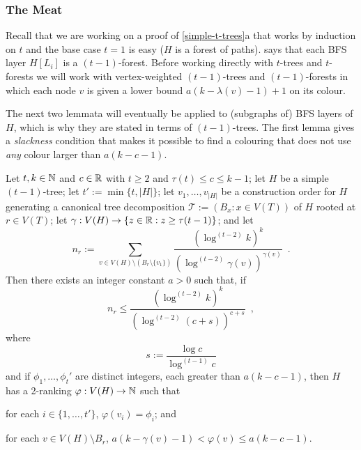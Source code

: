 \documentclass[kpfonts]{patmorin}
\newcommand{\trn}{\chi_2}
\theoremstyle{named}
\newcommand{\weirdref}[2]{\cref{#1}#2}
\begin{document}
\subsubsection{The Meat}


Recall that we are working on a proof of \weirdref{simple-t-trees}{a} that works by induction on $t$ and the base case $t=1$ is easy ($H$ is a forest of paths).  says that each BFS layer $H[L_i]$ is a $(t-1)$-forest.  Before working directly with $t$-trees and $t$-forests we will work with vertex-weighted $(t-1)$-trees and $(t-1)$-forests in which each node $v$ is given a lower bound $a(k-\lambda(v)-1)+1$ on its colour.

The next two lemmata will eventually be applied to (subgraphs of) BFS layers of $H$, which is why they are stated in terms of $(t-1)$-trees.  The first lemma gives a \emph{slackness} condition that makes it possible to find a colouring that does not use \emph{any} colour larger than $a(k-c-1)$.

\begin{lem}\label{t-tree-slack}
Let $t,k\in\mathbb{N}$ and $c\in\mathbb{R}$ with $t\ge 2$ and $\tau(t)\le c\le k-1$; let $H$ be a simple $(t-1)$-tree; let $t':=\min\{t, |H|\}$; let $v_1,\ldots,v_{|H|}$ be a construction order for $H$ generating a canonical tree decomposition $\mathcal{T}:=(B_x:x\in V(T))$ of $H$ rooted at $r\in V(T)$; let $\gamma:V(H)\to\{z\in\mathbb{R}: z\ge \tau(t-1)\}$; and let
\[
    n_r:=\sum_{v\in V(H)\setminus (B_r\setminus\{v_1\})} \frac{\left(\log^{(t-2)} k\right)^k}{\left(\log^{(t-2)} \gamma(v)\right)^{\gamma(v)}} \enspace .
\]
Then there exists an integer constant $a>0$ such that,
if
\begin{equation}
     n_r \le \frac{(\log^{(t-2)} k)^k}{\left(\log^{(t-2)} (c + s)\right)^{c+s}} \enspace ,
 \label{total-weight-i}
\end{equation}
where
\[
    s := \frac{\log c}{\log^{(t-1)} c}
\]
and if $\phi_1,\ldots,\phi_t'$ are distinct integers, each greater than $a(k-c-1)$,
then $H$ has a 2-ranking $\varphi:V(H)\to\mathbb{N}$ such that
\begin{compactenum}[(P1)]
    \item for each $i\in\{1,\ldots,{t'}\}$, $\varphi(v_i)=\phi_i$; and
    \item for each $v\in V(H)\setminus B_r$, $a(k-\gamma(v)-1) < \varphi(v) \le a(k-c-1)$.
\end{compactenum}
\end{lem}
\end{document}
